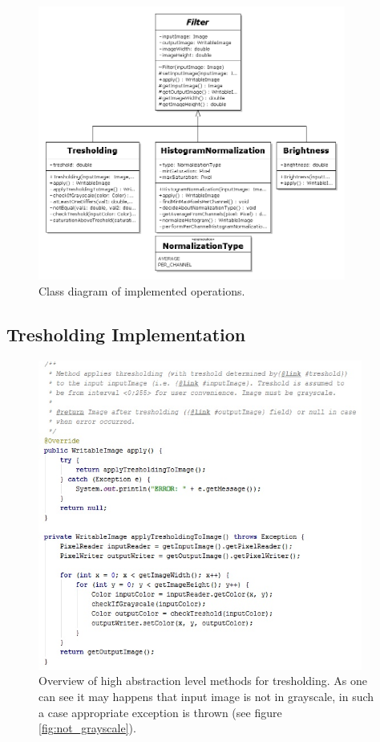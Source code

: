 \documentclass{article}
\begin{document}
\begin{figure}[H]
	\centering
	\includegraphics[width=0.9\textwidth]{_Figures/class_diagram_2.png}
    \caption{Class diagram of implemented operations.}
    \label{fig:class_diag}
\end{figure}

%
%
\subsection{Tresholding Implementation}

\begin{figure}[H]
	\centering
	\includegraphics[width=0.95\textwidth]{_Figures/treshold_function.jpg}
    \caption{Overview of high abstraction level methods for tresholding. As one can see it may happens that input image is not in grayscale, in such a case appropriate exception is thrown (see figure \ref{fig:not_grayscale}).}
    \label{fig:code:treshold_func}
\end{figure}
\end{document}
